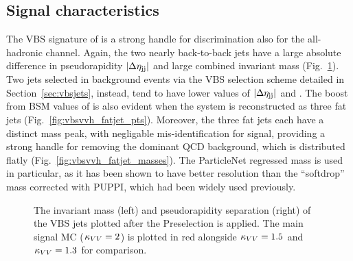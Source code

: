 \subsection{Signal characteristics}
The VBS signature of \VBSVVH is a strong handle for discrimination also for the all-hadronic channel. 
Again, the two nearly back-to-back jets have a large absolute difference in pseudorapidity $|\Delta\eta_{\mathrm{j}\mathrm{j}}|$ and large combined invariant mass \Mjj (Fig.~\ref{fig:vbsvvh_vbs_vars}). 
Two jets selected in background events via the VBS selection scheme detailed in Section~\ref{sec:vbsjets}, instead, tend to have lower values of $|\Delta\eta_{\mathrm{j}\mathrm{j}}|$ and \Mjj. 
The boost from BSM values of \kVV is also evident when the \VVH system is reconstructed as three fat jets (Fig.~\ref{fig:vbsvvh_fatjet_pts}). 
Moreover, the three fat jets each have a distinct mass peak, with negligable mis-identification for signal, providing a strong handle for removing the dominant QCD background, which is distributed flatly (Fig.~\ref{fig:vbsvvh_fatjet_masses}).
The ParticleNet regressed mass \MPNet is used in particular, as it has been shown to have better resolution than the ``softdrop'' mass corrected with PUPPI, which had been widely used previously. 

\begin{figure}[htb]
    \centering
    \qquad
    \caption{
        The invariant mass \Mjj (left) and pseudorapidity separation \detajj (right) of the VBS jets plotted after the Preselection is applied. 
        The main signal MC ($\kappa_{VV} = 2$) is plotted in red alongside $\kappa_{VV} = 1.5$ and $\kappa_{VV} = 1.3$ for comparison. 
    }
    \label{fig:vbsvvh_vbs_vars}
\end{figure}

